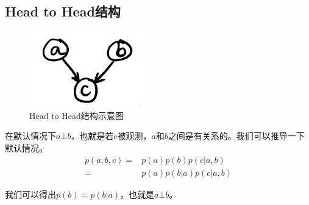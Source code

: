\documentclass[a4paper]{article}
\begin{document}
\subsection{Head to Head结构}
\begin{figure}[H]
    \centering
    \includegraphics[width=.35\textwidth]{微信图片_20191124104553.png}
    \caption{Head to Head结构示意图}
    
\end{figure}
在默认情况下$a\bot b$，也就是若$c$被观测，$a$和$b$之间是有关系的。我们可以推导一下默认情况。
\begin{equation}
    \begin{split}
        p(a,b,c) = & p(a)p(b)p(c|a,b) \\
        = & p(a)p(b|a)p(c|a,b)
    \end{split}
\end{equation}

我们可以得出$p(b)=p(b|a)$，也就是$a\bot b$。
\end{document}
